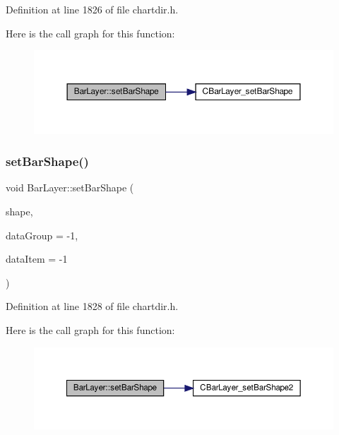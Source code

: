 Definition at line 1826 of file chartdir.\+h.

Here is the call graph for this function\+:
\nopagebreak
\begin{figure}[H]
\begin{center}
\leavevmode
\includegraphics[width=350pt]{class_bar_layer_a95b024aa48934d0917b0342d16d4fca5_cgraph}
\end{center}
\end{figure}
\mbox{\label{class_bar_layer_a20e27cf55af05ef6191f52d506e20910}} 
\subsubsection{\texorpdfstring{set\+Bar\+Shape()}{setBarShape()}\hspace{0.1cm}{\footnotesize\ttfamily [2/2]}}
{\footnotesize\ttfamily void Bar\+Layer\+::set\+Bar\+Shape (\begin{DoxyParamCaption}\item[{\hyperlink{class_int_array}{Int\+Array}}]{shape,  }\item[{int}]{data\+Group = {\ttfamily -\/1},  }\item[{int}]{data\+Item = {\ttfamily -\/1} }\end{DoxyParamCaption})\hspace{0.3cm}{\ttfamily [inline]}}



Definition at line 1828 of file chartdir.\+h.

Here is the call graph for this function\+:
\nopagebreak
\begin{figure}[H]
\begin{center}
\leavevmode
\includegraphics[width=350pt]{class_bar_layer_a20e27cf55af05ef6191f52d506e20910_cgraph}
\end{center}
\end{figure}
\mbox{\label{class_bar_layer_a3399504b16dbb8730329bd232c04cd9b}} 

